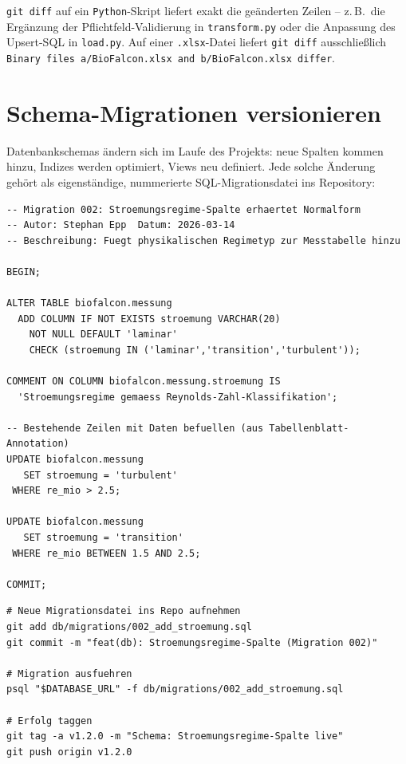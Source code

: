 \documentclass[12pt,a4paper]{report}
\theoremstyle{definition}
\theoremstyle{remark}
\newcommand{\py}{\texttt{Python}}
\newcommand{\code}[1]{\texttt{#1}}
\begin{document}
\code{git diff} auf ein \py-Skript liefert exakt die geänderten Zeilen --
z.\,B.\ die Ergänzung der Pflichtfeld-Validierung in \code{transform.py}
oder die Anpassung des Upsert-SQL in \code{load.py}. Auf einer
\code{.xlsx}-Datei liefert \code{git diff} ausschließlich
\code{Binary files a/BioFalcon.xlsx and b/BioFalcon.xlsx differ}.

\section{Schema-Migrationen versionieren}

Datenbankschemas ändern sich im Laufe des Projekts: neue Spalten kommen
hinzu, Indizes werden optimiert, Views neu definiert.
Jede solche Änderung gehört als eigenständige, nummerierte
SQL-Migrationsdatei ins Repository:

\begin{lstlisting}[style=sql, caption={db/migrations/002\_add\_stroemung.sql}]
-- Migration 002: Stroemungsregime-Spalte erhaertet Normalform
-- Autor: Stephan Epp  Datum: 2026-03-14
-- Beschreibung: Fuegt physikalischen Regimetyp zur Messtabelle hinzu

BEGIN;

ALTER TABLE biofalcon.messung
  ADD COLUMN IF NOT EXISTS stroemung VARCHAR(20)
    NOT NULL DEFAULT 'laminar'
    CHECK (stroemung IN ('laminar','transition','turbulent'));

COMMENT ON COLUMN biofalcon.messung.stroemung IS
  'Stroemungsregime gemaess Reynolds-Zahl-Klassifikation';

-- Bestehende Zeilen mit Daten befuellen (aus Tabellenblatt-Annotation)
UPDATE biofalcon.messung
   SET stroemung = 'turbulent'
 WHERE re_mio > 2.5;

UPDATE biofalcon.messung
   SET stroemung = 'transition'
 WHERE re_mio BETWEEN 1.5 AND 2.5;

COMMIT;
\end{lstlisting}

\begin{lstlisting}[style=bash, caption={Migrationsdatei committen und deployen}]
# Neue Migrationsdatei ins Repo aufnehmen
git add db/migrations/002_add_stroemung.sql
git commit -m "feat(db): Stroemungsregime-Spalte (Migration 002)"

# Migration ausfuehren
psql "$DATABASE_URL" -f db/migrations/002_add_stroemung.sql

# Erfolg taggen
git tag -a v1.2.0 -m "Schema: Stroemungsregime-Spalte live"
git push origin v1.2.0
\end{lstlisting}
\end{document}
